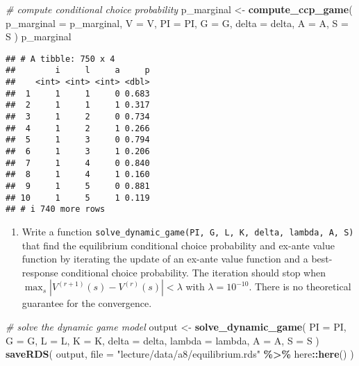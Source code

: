 \documentclass[
]{book}
\newenvironment{Shaded}{\begin{snugshade}}{\end{snugshade}}
\newcommand{\AttributeTok}[1]{\textcolor[rgb]{0.13,0.29,0.53}{#1}}
\newcommand{\CommentTok}[1]{\textcolor[rgb]{0.56,0.35,0.01}{\textit{#1}}}
\newcommand{\FunctionTok}[1]{\textcolor[rgb]{0.13,0.29,0.53}{\textbf{#1}}}
\newcommand{\NormalTok}[1]{#1}
\newcommand{\OtherTok}[1]{\textcolor[rgb]{0.56,0.35,0.01}{#1}}
\newcommand{\SpecialCharTok}[1]{\textcolor[rgb]{0.81,0.36,0.00}{\textbf{#1}}}
\newcommand{\StringTok}[1]{\textcolor[rgb]{0.31,0.60,0.02}{#1}}
\providecommand{\tightlist}{%
  \setlength{\itemsep}{0pt}\setlength{\parskip}{0pt}}
\begin{document}
\begin{Shaded}
\begin{Highlighting}[]
\CommentTok{\# compute conditional choice probability }
\NormalTok{p\_marginal }\OtherTok{\textless{}{-}} 
  \FunctionTok{compute\_ccp\_game}\NormalTok{(}
    \AttributeTok{p\_marginal =}\NormalTok{ p\_marginal,}
    \AttributeTok{V =}\NormalTok{ V,}
    \AttributeTok{PI =}\NormalTok{ PI,}
    \AttributeTok{G =}\NormalTok{ G,}
    \AttributeTok{delta =}\NormalTok{ delta,}
    \AttributeTok{A =}\NormalTok{ A,}
    \AttributeTok{S =}\NormalTok{ S}
\NormalTok{    )}
\NormalTok{p\_marginal}
\end{Highlighting}
\end{Shaded}

\begin{verbatim}
## # A tibble: 750 x 4
##        i     l     a     p
##    <int> <int> <int> <dbl>
##  1     1     1     0 0.683
##  2     1     1     1 0.317
##  3     1     2     0 0.734
##  4     1     2     1 0.266
##  5     1     3     0 0.794
##  6     1     3     1 0.206
##  7     1     4     0 0.840
##  8     1     4     1 0.160
##  9     1     5     0 0.881
## 10     1     5     1 0.119
## # i 740 more rows
\end{verbatim}

\begin{enumerate}
\def\labelenumi{\arabic{enumi}.}
\setcounter{enumi}{10}
\tightlist
\item
  Write a function \texttt{solve\_dynamic\_game(PI,\ G,\ L,\ K,\ delta,\ lambda,\ A,\ S)} that find the equilibrium conditional choice probability and ex-ante value function by iterating the update of an ex-ante value function and a best-response conditional choice probability. The iteration should stop when \(\max_s|V^{(r + 1)}(s) - V^{(r)}(s)| < \lambda\) with \(\lambda = 10^{-10}\). There is no theoretical guarantee for the convergence.
\end{enumerate}

\begin{Shaded}
\begin{Highlighting}[]
\CommentTok{\# solve the dynamic game model}
\NormalTok{output }\OtherTok{\textless{}{-}}
  \FunctionTok{solve\_dynamic\_game}\NormalTok{(}
    \AttributeTok{PI =}\NormalTok{ PI,}
    \AttributeTok{G =}\NormalTok{ G, }
    \AttributeTok{L =}\NormalTok{ L,}
    \AttributeTok{K =}\NormalTok{ K,}
    \AttributeTok{delta =}\NormalTok{ delta,}
    \AttributeTok{lambda =}\NormalTok{ lambda,}
    \AttributeTok{A =}\NormalTok{ A,}
    \AttributeTok{S =}\NormalTok{ S}
\NormalTok{    )}
\FunctionTok{saveRDS}\NormalTok{(}
\NormalTok{  output, }
  \AttributeTok{file =} \StringTok{"lecture/data/a8/equilibrium.rds"} \SpecialCharTok{\%\textgreater{}\%}\NormalTok{ here}\SpecialCharTok{::}\FunctionTok{here}\NormalTok{()}
\NormalTok{)}
\end{Highlighting}
\end{Shaded}
\end{document}
